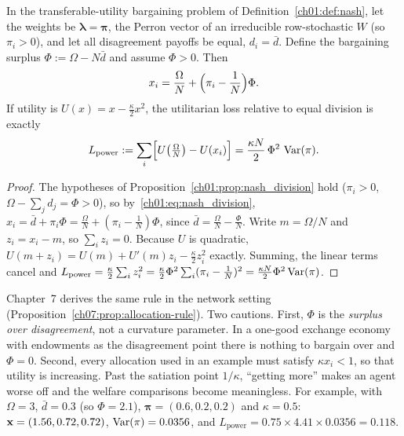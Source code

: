 \documentclass[../structural_economics_book.tex]{subfiles}
\begin{document}
\begin{proposition}\label{ch01:prop:allocation_rule}
In the transferable-utility bargaining problem of Definition~\ref{ch01:def:nash}, let the weights be $\boldsymbol{\lambda} = \boldsymbol{\pi}$, the Perron vector of an irreducible row-stochastic $W$ (so $\pi_i > 0$), and let all disagreement payoffs be equal, $d_i = \bar d$. Define the bargaining surplus $\Phi := \Omega - N\bar d$ and assume $\Phi > 0$. Then
\begin{equation}\label{ch01:eq:allocation_rule}
x_i = \frac{\Omega}{N} + \Bigl(\pi_i - \frac{1}{N}\Bigr)\Phi.
\end{equation}
If utility is $U(x) = x - \frac{\kappa}{2}x^2$, the utilitarian loss relative to equal division is exactly
\begin{equation}\label{ch01:eq:L_power}
L_{\text{power}} := \sum_i \Bigl[U\bigl(\tfrac{\Omega}{N}\bigr) - U(x_i)\Bigr] = \frac{\kappa N}{2}\,\Phi^2\,\operatorname{Var}(\pi).
\end{equation}
\end{proposition}
\begin{proof}
The hypotheses of Proposition~\ref{ch01:prop:nash_division} hold ($\pi_i > 0$, $\Omega - \sum_j d_j = \Phi > 0$), so by~\eqref{ch01:eq:nash_division}, $x_i = \bar d + \pi_i\Phi = \frac{\Omega}{N} + (\pi_i - \frac1N)\Phi$, since $\bar d = \frac{\Omega}{N} - \frac{\Phi}{N}$. Write $m = \Omega/N$ and $z_i = x_i - m$, so $\sum_i z_i = 0$. Because $U$ is quadratic, $U(m + z_i) = U(m) + U'(m)z_i - \frac{\kappa}{2}z_i^2$ exactly. Summing, the linear terms cancel and $L_{\text{power}} = \frac{\kappa}{2}\sum_i z_i^2 = \frac{\kappa}{2}\Phi^2\sum_i(\pi_i - \frac1N)^2 = \frac{\kappa N}{2}\Phi^2\operatorname{Var}(\pi)$.
\end{proof}

Chapter~7 derives the same rule in the network setting (Proposition~\ref{ch07:prop:allocation-rule}). Two cautions. First, $\Phi$ is the \textit{surplus over disagreement}, not a curvature parameter. In a one-good exchange economy with endowments as the disagreement point there is nothing to bargain over and $\Phi = 0$. Second, every allocation used in an example must satisfy $\kappa x_i < 1$, so that utility is increasing. Past the satiation point $1/\kappa$, ``getting more'' makes an agent worse off and the welfare comparisons become meaningless. For example, with $\Omega = 3$, $\bar d = 0.3$ (so $\Phi = 2.1$), $\boldsymbol{\pi} = (0.6, 0.2, 0.2)$ and $\kappa = 0.5$: $\mathbf{x} = (1.56, 0.72, 0.72)$, $\operatorname{Var}(\pi) = 0.0356$, and $L_{\text{power}} = 0.75 \times 4.41 \times 0.0356 = 0.118$.
\end{document}

